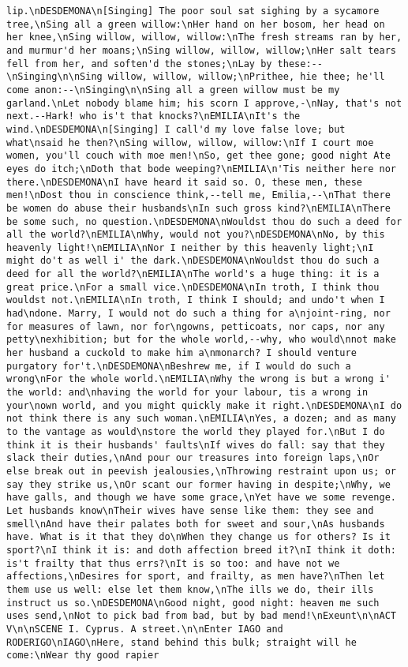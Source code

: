 \begin{verbatim}
lip.\nDESDEMONA\n[Singing] The poor soul sat sighing by a sycamore tree,\nSing all a green willow:\nHer hand on her bosom, her head on her knee,\nSing willow, willow, willow:\nThe fresh streams ran by her, and murmur'd her moans;\nSing willow, willow, willow;\nHer salt tears fell from her, and soften'd the stones;\nLay by these:--\nSinging\n\nSing willow, willow, willow;\nPrithee, hie thee; he'll come anon:--\nSinging\n\nSing all a green willow must be my garland.\nLet nobody blame him; his scorn I approve,-\nNay, that's not next.--Hark! who is't that knocks?\nEMILIA\nIt's the wind.\nDESDEMONA\n[Singing] I call'd my love false love; but what\nsaid he then?\nSing willow, willow, willow:\nIf I court moe women, you'll couch with moe men!\nSo, get thee gone; good night Ate eyes do itch;\nDoth that bode weeping?\nEMILIA\n'Tis neither here nor there.\nDESDEMONA\nI have heard it said so. O, these men, these men!\nDost thou in conscience think,--tell me, Emilia,--\nThat there be women do abuse their husbands\nIn such gross kind?\nEMILIA\nThere be some such, no question.\nDESDEMONA\nWouldst thou do such a deed for all the world?\nEMILIA\nWhy, would not you?\nDESDEMONA\nNo, by this heavenly light!\nEMILIA\nNor I neither by this heavenly light;\nI might do't as well i' the dark.\nDESDEMONA\nWouldst thou do such a deed for all the world?\nEMILIA\nThe world's a huge thing: it is a great price.\nFor a small vice.\nDESDEMONA\nIn troth, I think thou wouldst not.\nEMILIA\nIn troth, I think I should; and undo't when I had\ndone. Marry, I would not do such a thing for a\njoint-ring, nor for measures of lawn, nor for\ngowns, petticoats, nor caps, nor any petty\nexhibition; but for the whole world,--why, who would\nnot make her husband a cuckold to make him a\nmonarch? I should venture purgatory for't.\nDESDEMONA\nBeshrew me, if I would do such a wrong\nFor the whole world.\nEMILIA\nWhy the wrong is but a wrong i' the world: and\nhaving the world for your labour, tis a wrong in your\nown world, and you might quickly make it right.\nDESDEMONA\nI do not think there is any such woman.\nEMILIA\nYes, a dozen; and as many to the vantage as would\nstore the world they played for.\nBut I do think it is their husbands' faults\nIf wives do fall: say that they slack their duties,\nAnd pour our treasures into foreign laps,\nOr else break out in peevish jealousies,\nThrowing restraint upon us; or say they strike us,\nOr scant our former having in despite;\nWhy, we have galls, and though we have some grace,\nYet have we some revenge. Let husbands know\nTheir wives have sense like them: they see and smell\nAnd have their palates both for sweet and sour,\nAs husbands have. What is it that they do\nWhen they change us for others? Is it sport?\nI think it is: and doth affection breed it?\nI think it doth: is't frailty that thus errs?\nIt is so too: and have not we affections,\nDesires for sport, and frailty, as men have?\nThen let them use us well: else let them know,\nThe ills we do, their ills instruct us so.\nDESDEMONA\nGood night, good night: heaven me such uses send,\nNot to pick bad from bad, but by bad mend!\nExeunt\n\nACT V\n\nSCENE I. Cyprus. A street.\n\nEnter IAGO and RODERIGO\nIAGO\nHere, stand behind this bulk; straight will he come:\nWear thy good rapier 
\end{verbatim}
